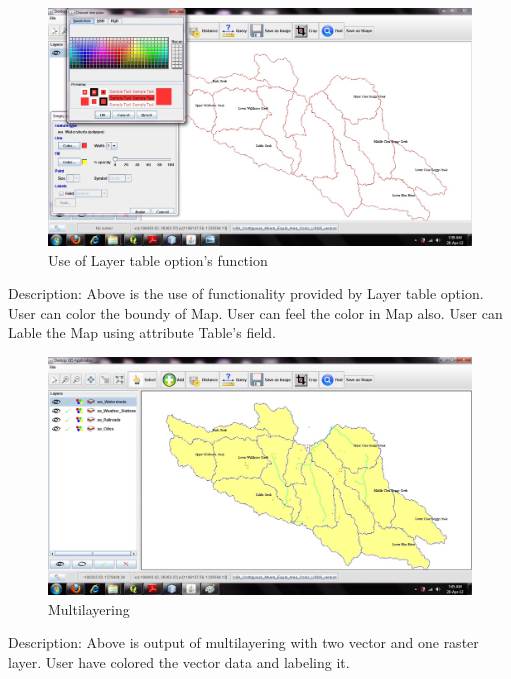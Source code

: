 \newpage
\begin{figure}[h]
\begin{center}
  \includegraphics[scale=0.43] {5.jpg}
  \caption[Screenshot - Style]{Use of Layer table option’s function}
\end{center}
\end{figure}
Description: Above is the use of functionality provided by Layer table option. User can color the boundy of Map. User can feel the color in Map also. User can Lable the Map using attribute Table’s field.

\newpage
\begin{figure}[h]
\begin{center}
  \includegraphics[scale=0.43] {6.jpg}
  \caption[Screenshot - Multilayering]{Multilayering}
\end{center}
\end{figure}
Description: Above is output of multilayering with two vector and one raster layer. User have colored the vector data and labeling it.

